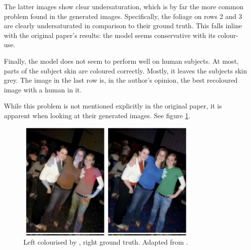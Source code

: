 \documentclass{article}
\begin{document}
        The latter images show clear undersaturation, which is by far the more common problem found in the generated images. Specifically, the foliage on rows 2 and 3 are clearly undersaturated in comparison to their ground truth. This falls inline with the original paper's results: the model seems conservative with its colour-use.
        
        Finally, the model does not seem to perform well on human subjects. At most, parts of the subject skin are coloured correctly. Mostly, it leaves the subjects skin grey. The image in the last row is, in the author's opinion, the best recoloured image with a human in it.
        
        While this problem is not mentioned explicitly in the original paper, it is apparent when looking at their generated images. See figure \ref{fig:origin}.
        
        \begin{figure}[H]
            \centering
            \includegraphics[width=\textwidth]{img/origin_paper_examp.jpg}
            \caption{Left colourised by \cite{deepkoal2017}, right ground truth. Adapted from \cite{deepkoal2017}.}
            \label{fig:origin}
        \end{figure}
        
        
        
\end{document}

